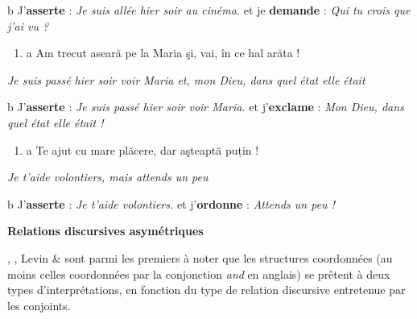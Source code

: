   b  J'\textbf{asserte} : \textit{Je suis allée hier soir au cinéma.} et je \textbf{demande} : \textit{Qui tu crois que j'ai vu ?}


\begin{enumerate}
\item \label{bkm:Ref300783487}a  Am trecut aseară pe la Maria şi, vai, în ce hal arăta !


\end{enumerate}
{\itshape
Je suis passé hier soir voir Maria et, mon Dieu, dans quel état elle était}

  b  J'\textbf{asserte} : \textit{Je suis passé hier soir voir Maria.} et j'\textbf{exclame} : \textit{Mon Dieu, dans quel état elle était !}


\begin{enumerate}
\item \label{bkm:Ref300783489}a  Te ajut cu mare plăcere, dar aşteaptă puțin !


\end{enumerate}
{\itshape
Je t'aide volontiers, mais attends un peu}

  b  J'\textbf{asserte} : \textit{Je t'aide volontiers.} et j'\textbf{ordonne} : \textit{Attends un peu !}

{\bfseries
Relations discursives asymétriques}

\citet{Lakoff1971}, \citet{Schmerling1975}, Levin \& \citet{Prince1986} sont parmi les premiers à noter que les structures coordonnées (au moins celles coordonnées par la conjonction \textit{and} en anglais) se prêtent à deux types d'interprétations, en fonction du type de relation discursive entretenue par les conjoints. 

